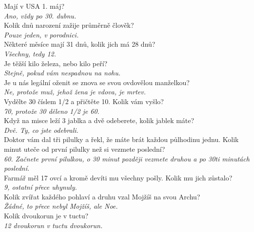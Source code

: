 \begin{multicols}{\value{columnsgames}}
\noindent
Mají v USA 1. máj?\\[1 mm]
{\sl Ano, vždy po 30. dubnu.}\\

\noindent
Kolik dnů narození zažije průměrně člověk?\\[1 mm]
{\sl Pouze jeden, v porodnici.}\\

\noindent
Některé měsíce mají 31 dnů, kolik jich má 28 dnů?\\[1 mm]
{\sl Všechny, tedy 12.}\\

\noindent
Je těžší kilo železa, nebo kilo peří?\\[1 mm]
{\sl Stejně, pokud vám nespadnou na nohu.}\\

\noindent
Je u nás legální oženit se znova se svou ovdovělou
manželkou?\\[1 mm]
{\sl Ne, protože muž, jehož žena je vdova, je mrtev.}\\

\noindent
Vydělte 30 číslem 1/2 a přičtěte 10. Kolik vám vyšlo?\\[1 mm]
{\sl 70, protože 30 děleno 1/2 je 60.}\\

\noindent
Když na misce leží 3 jablka a dvě odeberete, kolik jablek máte?\\[1 mm]
{\sl Dvě. Ty, co jste odebrali.}\\

\noindent
Doktor vám dal tři pilulky a řekl, že máte brát každou půlhodinu
jednu. Kolik minut uteče od první pilulky než si vezmete poslední?\\[1 mm]
{\sl 60. Začnete první pilulkou, o 30 minut později vezmete druhou
a po 30ti minutách poslední.}\\

\noindent
Farmář měl 17 ovcí a kromě devíti mu všechny pošly. Kolik mu
jich zůstalo?\\[1 mm]
{\sl 9, ostatní přece uhynuly.}\\

\noindent
Kolik zvířat každého pohlaví a druhu vzal Mojžíš na svou Archu?\\[1 mm]
{\sl Žádné, to přece nebyl Mojžíš, ale Noe.}\\

\noindent
Kolik dvoukorun je v tuctu?\\[1 mm]
{\sl 12 dvoukorun v tuctu dvoukorun.}\\


\end{multicols}
